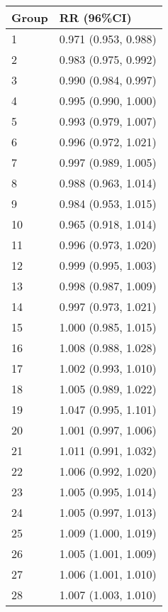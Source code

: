 \begin{tabular}{ll}
  \hline
Group & RR (96\%CI) \\ 
  \hline
   1 & 0.971 (0.953, 0.988) \\ 
     2 & 0.983 (0.975, 0.992) \\ 
     3 & 0.990 (0.984, 0.997) \\ 
     4 & 0.995 (0.990, 1.000) \\ 
     5 & 0.993 (0.979, 1.007) \\ 
     6 & 0.996 (0.972, 1.021) \\ 
     7 & 0.997 (0.989, 1.005) \\ 
     8 & 0.988 (0.963, 1.014) \\ 
     9 & 0.984 (0.953, 1.015) \\ 
    10 & 0.965 (0.918, 1.014) \\ 
    11 & 0.996 (0.973, 1.020) \\ 
    12 & 0.999 (0.995, 1.003) \\ 
    13 & 0.998 (0.987, 1.009) \\ 
    14 & 0.997 (0.973, 1.021) \\ 
    15 & 1.000 (0.985, 1.015) \\ 
    16 & 1.008 (0.988, 1.028) \\ 
    17 & 1.002 (0.993, 1.010) \\ 
    18 & 1.005 (0.989, 1.022) \\ 
    19 & 1.047 (0.995, 1.101) \\ 
    20 & 1.001 (0.997, 1.006) \\ 
    21 & 1.011 (0.991, 1.032) \\ 
    22 & 1.006 (0.992, 1.020) \\ 
    23 & 1.005 (0.995, 1.014) \\ 
    24 & 1.005 (0.997, 1.013) \\ 
    25 & 1.009 (1.000, 1.019) \\ 
    26 & 1.005 (1.001, 1.009) \\ 
    27 & 1.006 (1.001, 1.010) \\ 
    28 & 1.007 (1.003, 1.010) \\ 
   \hline
\end{tabular}

